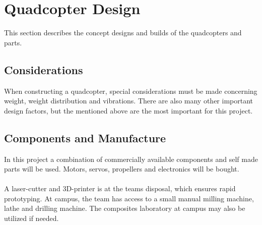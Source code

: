 \section{Quadcopter Design}
This section describes the concept designs and builds of the quadcopters and parts. 

\subsection{Considerations}
When constructing a quadcopter, special considerations must be made concerning weight, weight distribution and vibrations. There are also many other important design factors, but the mentioned above are the most important for this project.  

\subsection{Components and Manufacture}
In this project a combination of commercially available components and self made parts will be used. Motors, servos, propellers and electronics will be bought.
\\\\
A laser-cutter and 3D-printer is at the teams disposal, which ensures rapid prototyping. At campus, the team has access to a small manual milling machine, lathe and drilling machine. The composites laboratory at campus may also be utilized if needed.

